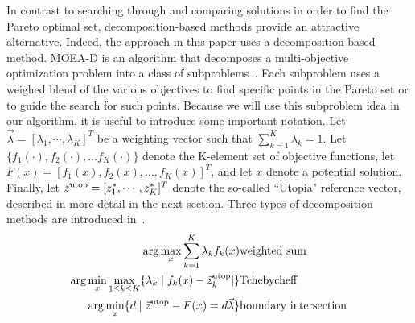 \documentclass{article}
\begin{document}

In contrast to searching through and comparing solutions in order to find the Pareto optimal set, decomposition-based methods provide an attractive alternative.  
Indeed, the approach in this paper uses a decomposition-based method.  
MOEA-D is an algorithm that decomposes a multi-objective optimization problem into a class of subproblems~\cite{4358754}.  
Each subproblem uses a weighed blend of the various objectives to find specific points in the Pareto set or to guide the search for such points.  
Because we  will use this subproblem idea in our algorithm, it is useful to introduce some important notation.
Let $ \vec{\lambda} = [ \lambda_{1} , \cdots , \lambda_{K}  ]^{T} $ be a weighting vector such that $ \sum_{k=1}^{K} \lambda_{k} = 1 $.  Let $\{f_1(\cdot), f_2(\cdot), \ldots f_{K}(\cdot)\}$ denote the K-element set of objective functions, let $F(x) = [f_1(x), f_2(x), \ldots, f_K(x)]^T$, and let $x$ denote a potential solution.  Finally, let $ \vec{z}^{\rm utop} = [z^{*}_{1}, \cdots , z^{*}_{K}]^{T} $ denote the so-called ``Utopia" reference vector, described in more detail in the next section. 
Three types of decomposition methods are introduced in~\cite{4358754}.
\begin{eqnarray}
 \arg\max_x \sum_{k=1}^{K} \lambda_{k} f_{k} (x) & {\rm weighted \ sum} \label{eq:weighted}\\
 \arg\min_x\max_{1 \leq k \leq K}  \{ \lambda_{k} \mid f_{k}(x) - \vec{z}^{\rm utop}_{k}  | \} & {\rm Tchebycheff} \label{eq:Tchebycheff}\\
 \arg\min_x \{ d \mid \vec{z}^{\rm utop} - F(x) = d \vec{\lambda} \} & {\rm boundary \ intersection} \label{eq:boundary}
\end{eqnarray}
\end{document}
